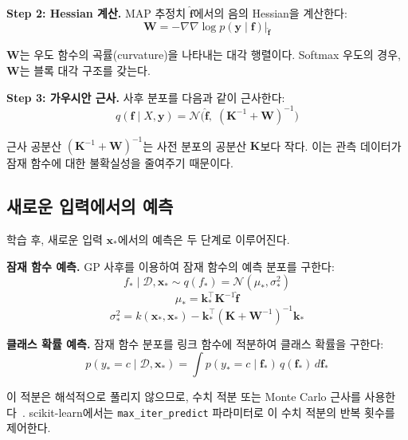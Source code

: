 \documentclass[11pt]{article}
\begin{document}
\textbf{Step 2: Hessian 계산.}
MAP 추정치 $\hat{\mathbf{f}}$에서의 음의 Hessian을 계산한다:
\begin{equation}
\mathbf{W} = -\nabla\nabla \log p(\mathbf{y} \mid \mathbf{f})\big|_{\hat{\mathbf{f}}}
\label{eq:hessian}
\end{equation}

$\mathbf{W}$는 우도 함수의 곡률(curvature)을 나타내는 대각 행렬이다.
Softmax 우도의 경우, $\mathbf{W}$는 블록 대각 구조를 갖는다.

\textbf{Step 3: 가우시안 근사.}
사후 분포를 다음과 같이 근사한다:
\begin{equation}
q(\mathbf{f} \mid X, \mathbf{y}) = \mathcal{N}\bigl(\hat{\mathbf{f}},\; (\mathbf{K}^{-1} + \mathbf{W})^{-1}\bigr)
\label{eq:laplace_approx}
\end{equation}

근사 공분산 $(\mathbf{K}^{-1} + \mathbf{W})^{-1}$는 사전 분포의 공분산 $\mathbf{K}$보다 작다.
이는 관측 데이터가 잠재 함수에 대한 불확실성을 줄여주기 때문이다.


\subsection{새로운 입력에서의 예측}

학습 후, 새로운 입력 $\mathbf{x}_*$에서의 예측은 두 단계로 이루어진다.

\textbf{잠재 함수 예측.}
GP 사후를 이용하여 잠재 함수의 예측 분포를 구한다:
\[
f_* \mid \mathcal{D}, \mathbf{x}_* \sim q(f_*) = \mathcal{N}(\mu_*, \sigma_*^2)
\]
\begin{equation}
\mu_* = \mathbf{k}_*^\top \mathbf{K}^{-1} \hat{\mathbf{f}}
\label{eq:pred_mean}
\end{equation}
\begin{equation}
\sigma_*^2 = k(\mathbf{x}_*, \mathbf{x}_*) - \mathbf{k}_*^\top (\mathbf{K} + \mathbf{W}^{-1})^{-1} \mathbf{k}_*
\label{eq:pred_var}
\end{equation}

\textbf{클래스 확률 예측.}
잠재 함수 분포를 링크 함수에 적분하여 클래스 확률을 구한다:
\begin{equation}
p(y_* = c \mid \mathcal{D}, \mathbf{x}_*) = \int p(y_* = c \mid \mathbf{f}_*) \, q(\mathbf{f}_*) \, d\mathbf{f}_*
\label{eq:pred_class}
\end{equation}

이 적분은 해석적으로 풀리지 않으므로, 수치 적분 또는 Monte Carlo 근사를 사용한다~\cite{Neal1998}.
scikit-learn에서는 \texttt{max\_iter\_predict} 파라미터로 이 수치 적분의 반복 횟수를 제어한다.
\end{document}
